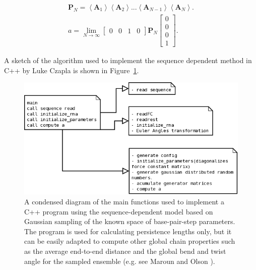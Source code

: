 \begin{gather}
\mathbf{P}_{N} = \left<\mathbf{A}_{1}\right> \left<\mathbf{A}_{2}\right> ... \left<
\mathbf{A}_{N-1}\right> \left< \mathbf{A}_{N}\right> .\\
a = \lim_{N \to \infty} \left[\begin{array}{cccc}0 & 0 & 1 & 0\end{array}
    \right] \mathbf{P}_{N}
\left[\begin{array}{c} 0\\ 0\\ 0\\ 1\end{array}\right] .
\end{gather}  

A sketch of the algorithm used to implement the sequence dependent
method in C++ by Luke Czapla is shown in Figure~\ref{fig:sketch}.

\begin{figure}
\centering
\includegraphics[angle=0, scale=0.5]{Appendix/generalschema.png}
\caption{A condensed diagram of the main functions used to implement a
  C++  program using  the sequence-dependent  model based  on Gaussian
  sampling  of  the  known  space of  base-pair-step  parameters.  The
  program is used for calculating persistence lengths only, but it can
  be easily adapted  to compute other global chain  properties such as
  the average end-to-end distance and  the global bend and twist angle
  for   the   sampled   ensemble    (e.g.   see   Maroun   and   Olson
  \cite{maroun1988b}).}
\label{fig:sketch}
\end{figure}  










